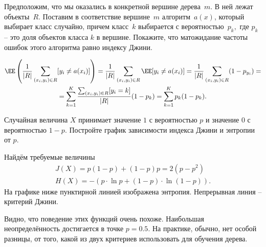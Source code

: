 \documentclass[12pt,a4paper]{article}
\begin{document}
\begin{vkProblem}
    Предположим, что мы оказались в конкретной вершине дерева~$m$. В ней лежат объекты~$R$. 
    Поставим в соответствие вершине~$m$ алгоритм~$a(x)$, 
    который выбирает класс случайно, причем класс~$k$ выбирается
    с вероятностью~$p_{k},$ где $p_k$ -- это доля объектов класса $k$ в вершине.
    Покажите, что матожидание частоты ошибок этого алгоритма равно индексу Джини.
\end{vkProblem}

\begin{esSolution}
    \begin{multline*}
        \EE \left( \frac{1}{|R|} \sum_{(x_i, y_i) \in R} [y_i \neq a(x_i)] \right)
        =
        \frac{1}{|R|} \sum_{(x_i, y_i) \in R} \EE [y_i \neq a(x_i)]
        =
        \frac{1}{|R|} \sum_{(x_i, y_i) \in R} (1 - p_{y_i})
        =\\
        =
        \sum_{k = 1}^{K} \frac{\sum_{(x_i, y_i) \in R} [y_i = k]}{|R|} (1 - p_{k})
        =
        \sum_{k = 1}^{K} p_{k} (1 - p_{k}).
    \end{multline*}
\end{esSolution}


\begin{vkProblem}
Случайная величина $X$ принимает значение $1$ с вероятностью $p$ и значение $0$ с вероятностью $1-p$. Постройте график зависимости индекса Джини и энтропии от $p$.
\end{vkProblem}
\begin{esSolution}
Найдём требуемые величины
    \[
        \begin{aligned}
        J(X) = p (1 - p) + (1 - p) p = 2(p - p^2) \\ 
        H(X) = - (p \cdot \ln p + (1-p) \cdot \ln(1-p)).
        \end{aligned}
    \]
На графике ниже пунктирной линией изображена энтропия. Непрерывная линия -- критерий Джини. 
\begin{center}
\end{center}
Видно, что поведение этих функций очень похоже. Наибольшая неопределённость достигается в точке $p=0.5.$ На практике, обычно, нет особой разницы, от того, какой из двух критериев использовать для обучения дерева.
\end{esSolution}
\end{document}
